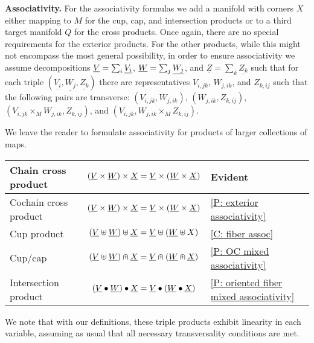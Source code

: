 \bigskip

\textbf{Associativity.}
For the associativity formulas we add a manifold with corners $X$ either mapping to $M$ for the cup, cap, and intersection products or to a third target manifold $Q$ for the cross products. Once again, there are no special requirements for the exterior products. For the other products, while this might not encompass the most general possibility, in order to ensure associativity we assume decompositions $\underline{V} = \sum_i \underline{V_i}$, $\underline{W} = \sum_j \underline{W_j}$, and $\underline{Z} = \sum_k \underline{Z_k}$ such that for each triple $(\underline{V_i},\underline{W_j}, \underline{Z_k})$ there are representatives $V_{i,jk}$, $W_{j,ik}$, and $Z_{k,ij}$ such that the following pairs are transverse: $(V_{i,jk}, W_{j,ik})$, $(W_{j,ik},Z_{k,ij})$, $(V_{i,jk} \times_M W_{j,ik},Z_{k,ij})$, and $(V_{i,jk}, W_{j,ik} \times_M Z_{k,ij})$.

We leave the reader to formulate associativity for products of larger collections of maps.


\bigskip

\begin{minipage}{\linewidth}
\centering





\begin{tabular}{|l|c|l|}
\hline
Chain cross product& $(\underline{V} \times \underline{W}) \times \underline{X} = \underline{V} \times (\underline{W} \times \underline{X})$&Evident\\
\hline
Cochain cross product& $(\underline{V} \times \underline{W}) \times \underline{X} = \underline{V} \times (\underline{W} \times \underline{X})$&\cref{P: exterior associativity}\\
\hline
Cup product &$(\underline{V}\uplus \underline{W})\uplus\underline{X} = \underline{V}\uplus(\underline{W}\uplus X)$&\cref{C: fiber assoc} \\
\hline
Cup/cap & $(\underline{V} \uplus \underline{W})\nplus \underline{X} = \underline{V}\nplus(\underline{W}\nplus\underline{X})$& \cref{P: OC mixed associativity}\\
\hline
Intersection product &
$(\underline{V}\bullet\underline{W})\bullet\underline{X} = \underline{V}\bullet(\underline{W}\bullet \underline{X})$&\cref{P: oriented fiber mixed associativity}\\
\hline
\end{tabular}
\end{minipage}

\bigskip

We note that with our definitions, these triple products exhibit linearity in each variable, assuming as usual that all necessary transversality conditions are met.



